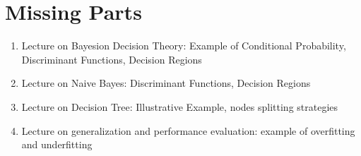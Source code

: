 \chapter{Missing Parts}

\begin{enumerate}
    \item Lecture on Bayesion Decision Theory: Example of Conditional Probability, Discriminant Functions, Decision Regions
    \item Lecture on Naive Bayes: Discriminant Functions, Decision Regions
    \item Lecture on Decision Tree: Illustrative Example, nodes splitting strategies
    \item Lecture on generalization and performance evaluation: example of overfitting and underfitting 
\end{enumerate}